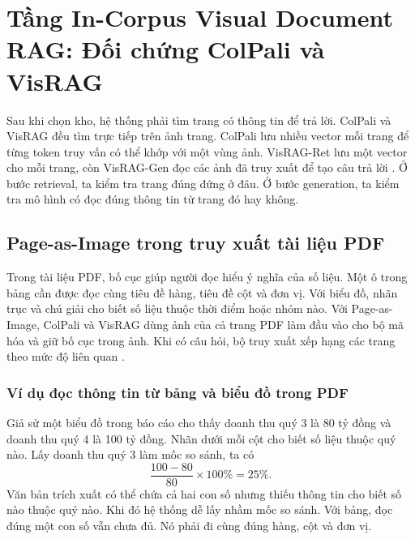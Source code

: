 
\section{Tầng In-Corpus Visual Document RAG: Đối chứng ColPali và VisRAG}
\label{sec:method_vision_doc}


Sau khi chọn kho, hệ thống phải tìm trang có thông tin để trả lời.
ColPali và VisRAG đều tìm trực tiếp trên ảnh trang. ColPali lưu nhiều
vector mỗi trang để từng token truy vấn có thể khớp với một vùng ảnh.
VisRAG-Ret lưu một vector cho mỗi trang, còn VisRAG-Gen đọc các ảnh đã
truy xuất để tạo câu trả lời \cite{faysse2025colpali,yu2025visrag}.
Ở bước retrieval, ta kiểm tra trang đúng đứng ở đâu. Ở bước generation,
ta kiểm tra mô hình có đọc đúng thông tin từ trang đó hay không.

\subsection{Page-as-Image trong truy xuất tài liệu PDF}
\label{subsec:vision_paradigm}

Trong tài liệu PDF, bố cục giúp người đọc hiểu ý nghĩa của số liệu.
Một ô trong bảng cần được đọc cùng tiêu đề hàng, tiêu đề cột và đơn vị.
Với biểu đồ, nhãn trục và chú giải cho biết số liệu thuộc thời điểm
hoặc nhóm nào. Với Page-as-Image, ColPali và VisRAG dùng ảnh của cả
trang PDF làm đầu vào cho bộ mã hóa và giữ bố cục trong ảnh. Khi có
câu hỏi, bộ truy xuất xếp hạng các trang theo mức độ liên quan
\cite{faysse2025colpali,yu2025visrag}.

\subsubsection{Ví dụ đọc thông tin từ bảng và biểu đồ trong PDF}

Giả sử một biểu đồ trong báo cáo cho thấy doanh thu quý 3 là 80 tỷ
đồng và doanh thu quý 4 là 100 tỷ đồng. Nhãn dưới mỗi cột cho biết số
liệu thuộc quý nào. Lấy doanh thu quý 3 làm mốc so sánh, ta có
\[
    \frac{100-80}{80}\times100\% = 25\%.
\]
Văn bản trích xuất có thể chứa cả hai con số nhưng thiếu thông tin
cho biết số nào thuộc quý nào. Khi đó hệ thống dễ lấy nhầm mốc so
sánh. Với bảng, đọc đúng một con số vẫn chưa đủ. Nó phải đi cùng
đúng hàng, cột và đơn vị.

